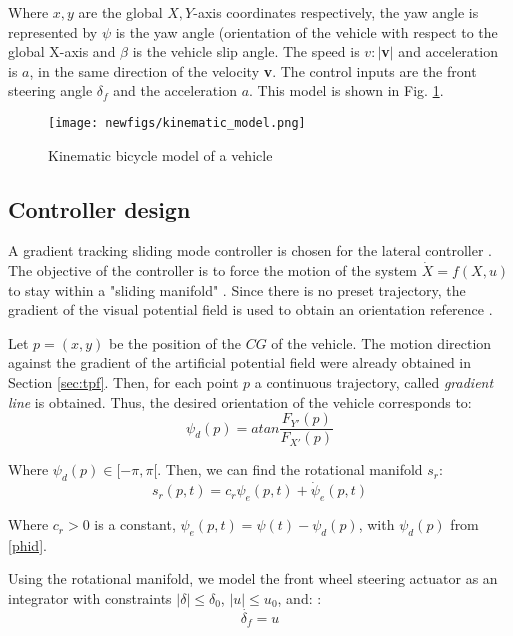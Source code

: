 \documentclass[letterpaper, 10 pt, conference]{ieeeconf}  %
\begin{document}
Where $x,y$ are the global $X,Y$-axis coordinates respectively, the yaw angle is represented by $\psi$ is the yaw angle (orientation of the vehicle with respect to the global X-axis and $\beta$ is the vehicle slip angle. The speed is $v:|$\textbf{v}$|$ and acceleration is $a$, in the same direction of the velocity \textbf{v}. The control inputs are the front steering angle $\delta_f$ and the acceleration $a$. This model is shown in Fig. \ref{fig:kin_model}.

\begin{figure}[h!]
    \centering
    \texttt{[image: newfigs/kinematic\_model.png]}
    \caption{Kinematic bicycle model of a vehicle}
    \label{fig:kin_model}
\end{figure}

\subsection{Controller design}

A gradient tracking sliding mode controller is chosen for the lateral controller \cite{guldner1995tracking,ferrara2007gradient}. The objective of the controller is to force the motion of the system $\dot{X}=f({X},u)$ to stay within a "sliding manifold" \cite{utkin2009sliding}. Since there is no preset trajectory, the gradient of the visual potential field is used to obtain an orientation reference \cite{ferrara2007gradient}.

Let $p=(x,y)$ be the position of the $CG$ of the vehicle. The motion direction against the gradient of the artificial potential field were already obtained in Section \ref{sec:tpf}. Then, for each point $p$ a continuous trajectory, called \textit{gradient line} is obtained. Thus, the desired orientation of the vehicle corresponds to:
\begin{equation}\label{phid}
    \psi_d(p)=atan\frac{F_{Y'}(p)}{F_{X'}(p)}
\end{equation}

Where $\psi_d(p) \in [-\pi,\pi[$. Then, we can find the rotational manifold $s_r$:
\begin{equation}
    s_r(p,t)=c_r\psi_e(p,t)+\dot{\psi}_e(p,t)
\end{equation}

Where $c_r>0$ is a constant, $\psi_e(p,t)=\psi(t)-\psi_d(p)$, with $\psi_d(p)$ from \eqref{phid}. 

Using the rotational manifold, we model the front wheel steering actuator as an integrator with constraints $|\delta|\leq \delta_0$,  $|u|\leq u_0$, and: \cite{guldner1995tracking}:
\begin{equation}
    \dot{\delta_f}=u
\end{equation}
\end{document}

